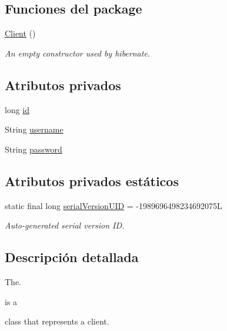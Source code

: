 \subsection*{Funciones del \textquotesingle{}package\textquotesingle{}}
\begin{DoxyCompactItemize}
\item 
\mbox{\hyperlink{a00164_a351f5095f2aa19b4b43bd39c069d7e43}{Client}} ()
\begin{DoxyCompactList}\small\item\em An empty constructor used by hibernate. \end{DoxyCompactList}\end{DoxyCompactItemize}
\subsection*{Atributos privados}
\begin{DoxyCompactItemize}
\item 
long \mbox{\hyperlink{a00164_ab353a203ee0d84148e34fbb27ff0dbb8}{id}}
\item 
String \mbox{\hyperlink{a00164_a0d105bbb8e72c4a5b70ec43f59227882}{username}}
\item 
String \mbox{\hyperlink{a00164_a1914bdf0282fd4a34b890a6fb775619e}{password}}
\end{DoxyCompactItemize}
\subsection*{Atributos privados estáticos}
\begin{DoxyCompactItemize}
\item 
static final long \mbox{\hyperlink{a00164_a6ac812041b6242509f710f231010ad7f}{serial\+Version\+U\+ID}} = -\/1989696498234692075L
\begin{DoxyCompactList}\small\item\em Auto-\/generated serial version ID. \end{DoxyCompactList}\end{DoxyCompactItemize}


\subsection{Descripción detallada}
The. 


\begin{DoxyCode}{0}
\end{DoxyCode}
 is a
\begin{DoxyCode}{0}
\end{DoxyCode}
 class that represents a client.

